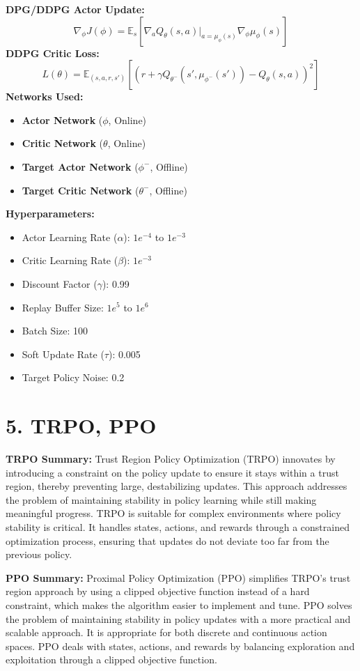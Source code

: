 \documentclass[a4paper,10pt]{article}
\begin{document}
\begin{multicols}{2}
\noindent \textbf{DPG/DDPG Actor Update:}
\[
\nabla_\phi J(\phi) = \mathbb{E}_s \left[ \nabla_a Q_\theta(s, a) \big|_{a=\mu_\phi(s)} \nabla_\phi \mu_\phi(s) \right]
\]
\textbf{DDPG Critic Loss:}
\[
L(\theta) = \mathbb{E}_{(s, a, r, s')} \left[ \left( r + \gamma Q_{\theta^-}(s', \mu_{\phi^-}(s')) - Q_\theta(s, a) \right)^2 \right]
\]
\textbf{Networks Used:}
\begin{itemize}
    \item \textbf{Actor Network} (\(\phi\), Online)
    \item \textbf{Critic Network} (\(\theta\), Online)
    \item \textbf{Target Actor Network} (\(\phi^-\), Offline)
    \item \textbf{Target Critic Network} (\(\theta^-\), Offline)
\end{itemize}
\textbf{Hyperparameters:}
\begin{itemize}
    \item Actor Learning Rate (\(\alpha\)): \(1e^{-4}\) to \(1e^{-3}\)
    \item Critic Learning Rate (\(\beta\)): \(1e^{-3}\)
    \item Discount Factor (\(\gamma\)): 0.99
    \item Replay Buffer Size: \(1e^5\) to \(1e^6\)
    \item Batch Size: 100
    \item Soft Update Rate (\(\tau\)): 0.005
    \item Target Policy Noise: 0.2
\end{itemize}

\section*{5. TRPO, PPO}
\textbf{TRPO Summary:} Trust Region Policy Optimization (TRPO) innovates by introducing a constraint on the policy update to ensure it stays within a trust region, thereby preventing large, destabilizing updates. This approach addresses the problem of maintaining stability in policy learning while still making meaningful progress. TRPO is suitable for complex environments where policy stability is critical. It handles states, actions, and rewards through a constrained optimization process, ensuring that updates do not deviate too far from the previous policy.

\noindent \textbf{PPO Summary:} Proximal Policy Optimization (PPO) simplifies TRPO’s trust region approach by using a clipped objective function instead of a hard constraint, which makes the algorithm easier to implement and tune. PPO solves the problem of maintaining stability in policy updates with a more practical and scalable approach. It is appropriate for both discrete and continuous action spaces. PPO deals with states, actions, and rewards by balancing exploration and exploitation through a clipped objective function.


\end{multicols}
\end{document}
